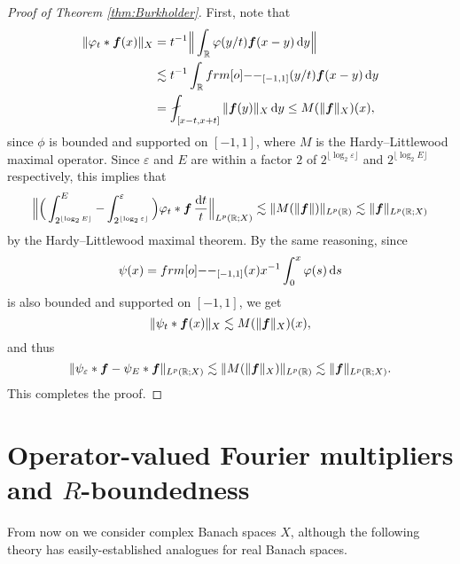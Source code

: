 \begin{proof}[Proof of Theorem \ref{thm:Burkholder}]
First, note that
\begin{equation*}
  \begin{aligned}
    \|\phi_{t} \ast \mb{f}(x)\|_{X} &= t^{-1} \Big\| \int_{\R} \phi(y/t) \mb{f}(x-y) \, \dd y \Big\| \\
    &\lesssim t^{-1} \int_{\R} \1_{[-1,1]}(y/t) \mb{f}(x-y) \, \dd y \\
    &= \fint_{[x-t, x+t]} \|\mb{f}(y)\|_{X} \, \dd y \leq M(\|\mb{f}\|_{X})(x),
  \end{aligned}
\end{equation*}
since $\phi$ is bounded and supported on $[-1,1]$, where $M$ is the Hardy--Littlewood maximal operator.
Since $\varepsilon$ and $E$ are within a factor $2$ of $2^{\lfloor \log_{2} \varepsilon \rfloor}$ and $2^{\lfloor \log_{2} E \rfloor}$ respectively, this implies that
\begin{equation*}
  \Big\| \Big( \int_{2^{\lfloor \log_{2} E \rfloor}}^{E} - \int_{2^{\lfloor \log_{2} \varepsilon \rfloor}}^{\varepsilon} \Big) \varphi_{t} \ast \bm{f} \, \frac{\mathrm{d} t}{t} \Big\|_{L^p(\mathbb{R};X)}
  \lesssim \|M(\|\bm{f}\|)\|_{L^p(\mathbb{R})} \lesssim \|\bm{f}\|_{L^p(\mathbb{R};X)}
\end{equation*}
by the Hardy--Littlewood maximal theorem.
By the same reasoning, since
\begin{equation*}
  \psi(x) = \1_{[-1,1]}(x) x^{-1} \int_{0}^{x} \phi(s) \, \dd s
\end{equation*}
is also bounded and supported on $[-1,1]$, we get
\begin{equation*}
  \|\psi_{t} \ast \bm{f}(x)\|_{X} \lesssim M(\|\bm{f}\|_{X})(x),
\end{equation*}
and thus
\begin{equation*}
  \|\psi_{\varepsilon} \ast \bm{f} - \psi_{E} \ast \bm{f}\|_{L^p(\mathbb{R};X)} \lesssim \|M(\|\bm{f}\|_{X})\|_{L^p(\mathbb{R})} \lesssim \|\bm{f}\|_{L^p(\mathbb{R};X)}.
\end{equation*}
This completes the proof.
\end{proof}

\section{Operator-valued Fourier multipliers and $R$-boundedness}

From now on we consider complex Banach spaces $X$, although the following theory has easily-established analogues for real Banach spaces.

